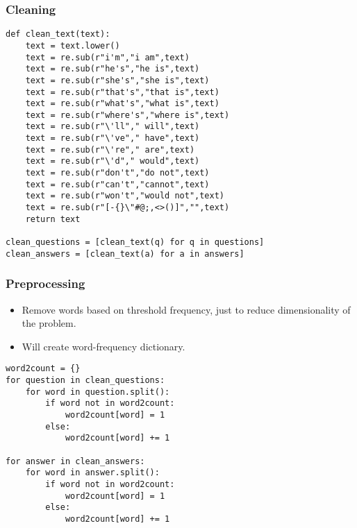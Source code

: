 \begin{frame}[fragile]\frametitle{Cleaning}
\begin{lstlisting}
def clean_text(text):
    text = text.lower()
    text = re.sub(r"i'm","i am",text)
    text = re.sub(r"he's","he is",text)
    text = re.sub(r"she's","she is",text)
    text = re.sub(r"that's","that is",text)
    text = re.sub(r"what's","what is",text)    
    text = re.sub(r"where's","where is",text)        
    text = re.sub(r"\'ll"," will",text)         
    text = re.sub(r"\'ve"," have",text) 
    text = re.sub(r"\'re"," are",text)     
    text = re.sub(r"\'d"," would",text)      
    text = re.sub(r"don't","do not",text)
    text = re.sub(r"can't","cannot",text)    
    text = re.sub(r"won't","would not",text)        
    text = re.sub(r"[-{}\"#@;,<>()]","",text)
    return text

clean_questions = [clean_text(q) for q in questions]
clean_answers = [clean_text(a) for a in answers]
\end{lstlisting}
\end{frame}

\begin{frame}[fragile]\frametitle{Preprocessing}
\begin{itemize}
\item Remove words based on threshold frequency, just to reduce dimensionality of the problem.
\item Will create word-frequency dictionary.
\end{itemize}

\begin{lstlisting}
word2count = {}
for question in clean_questions:
    for word in question.split():
        if word not in word2count:
            word2count[word] = 1
        else:
            word2count[word] += 1

for answer in clean_answers:
    for word in answer.split():
        if word not in word2count:
            word2count[word] = 1
        else:
            word2count[word] += 1
\end{lstlisting}
\end{frame}

